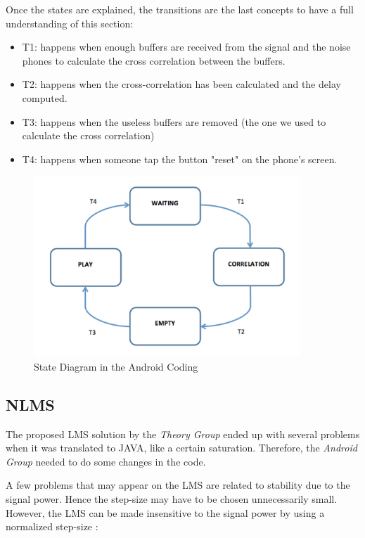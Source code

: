 \documentclass[11pt,a4paper,english]{book}  %
\theoremstyle{definition}  %
\theoremstyle{plain}  %
\theoremstyle{remark}  %
\begin{document}
		Once the states are explained, the transitions are the last concepts to have a full understanding of this section:
		
		\begin{itemize}
		\item T1: happens when enough buffers are received from the signal and the noise phones to calculate the cross correlation between the buffers.
		\item T2: happens when the cross-correlation has been calculated and the delay computed.
		\item T3: happens when the useless buffers are removed (the one we used to calculate the cross correlation)
		\item T4: happens when someone tap the button "reset" on the phone’s screen.
		\end{itemize}


		\begin{figure}[h]
		\centering
		\includegraphics[width=10cm]{images/android/states}
		\caption{State Diagram in the Android Coding}
		\label{fig:states}
		\end{figure}	
		
		
		\subsection{NLMS}
		
		The proposed LMS solution by the \textit{Theory Group} ended up with several problems when it was translated to JAVA, like a certain saturation. Therefore, the \textit{Android Group} needed to do some changes in the code.
		
		A few problems that may appear on the LMS are related to stability due to the signal power. Hence the step-size may have to be chosen unnecessarily small. However, the LMS can be made insensitive to the signal power by using a normalized step-size \cite{asp}:
		
\end{document}
